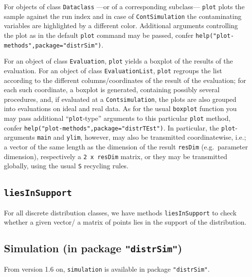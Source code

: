\documentclass[11pt]{article}
\newcommand{\code}[1]{{\tt #1}}
\newcommand{\pkg}[1]{{\tt "#1"}}
\begin{document}
\par
For objects of  class \code{Dataclass} ---or of a corresponding subclass---
 \code{plot} plots the sample against the run index and in case  of  
 \code{ContSimulation} the contaminating variables are highlighted by a 
 different color. Additional arguments controlling
 the plot as in the default \code{plot} command may be passed, 
 confer \code{help("plot-methods",package="distrSim")}.
 \par
 For an object of class \code{Evaluation},
\code{plot} yields a boxplot of the results of the evaluation.
For an object of class \code{EvaluationList},
\code{plot} regroups the list according to the different columns/coordinates of 
the result of the evaluation; for each such coordinate, a boxplot is generated, 
containing possibly several procedures, and, if evaluated at a 
\code{Contsimulation}, the plots are also grouped into evaluations on ideal and
real data. As for the usual \code{boxplot} function you may pass additional 
``\code{plot}-type'' arguments to this particular \code{plot} method, confer 
\code{help("plot-methods",package="distrTEst")}. In particular, the 
\code{plot}-arguments \code{main} and \code{ylim}, however, may also be 
transmitted coordinatewise, i.e.; a vector of the same length as the dimension 
of the result {\tt resDim} (e.g.\ parameter dimension), respectively a 
{\tt 2 x resDim} matrix, or they may be transmitted globally, using the 
usual {\tt S} recycling rules.
\subsection[liesInSupport]{\code{liesInSupport}}
For all discrete distribution classes, we have methods \code{liesInSupport} to 
check whether a given vector/ a matrix of points lies in the support of the 
distribution.

\subsection[Simulation (in package distrSim)]%
{Simulation (in package \pkg{distrSim})}
%
From version 1.6 on, \code{simulation} is available in package  \pkg{distrSim}.
\end{document}
